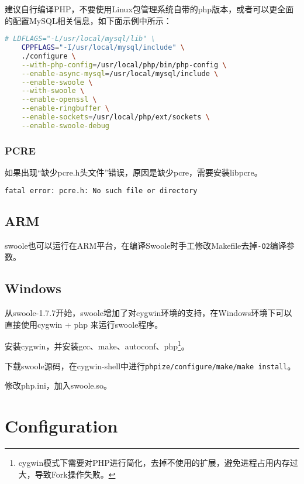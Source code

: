 建议自行编译PHP，不要使用Linux包管理系统自带的php版本，或者可以更全面的配置MySQL相关信息，如下面示例中所示：


\begin{lstlisting}[language=bash]
# LDFLAGS="-L/usr/local/mysql/lib" \
	CPPFLAGS="-I/usr/local/mysql/include" \
	./configure \
	--with-php-config=/usr/local/php/bin/php-config \
	--enable-async-mysql=/usr/local/mysql/include \
	--enable-swoole \
	--with-swoole \
	--enable-openssl \
	--enable-ringbuffer \
	--enable-sockets=/usr/local/php/ext/sockets \
	--enable-swoole-debug
\end{lstlisting}

\subsection{PCRE}

如果出现“缺少pcre.h头文件”错误，原因是缺少pcre，需要安装libpcre。


\begin{lstlisting}[language=bash]
fatal error: pcre.h: No such file or directory
\end{lstlisting}

\section{ARM}


swoole也可以运行在ARM平台，在编译Swoole时手工修改Makefile去掉\texttt{-O2}编译参数。

\section{Windows}


从swoole-1.7.7开始，swoole增加了对cygwin环境的支持，在Windows环境下可以直接使用cygwin + php 来运行swoole程序。

\begin{compactitem}
\item 安装cygwin，并安装gcc、make、autoconf、php\footnote{cygwin模式下需要对PHP进行简化，去掉不使用的扩展，避免进程占用内存过大，导致Fork操作失败。}。
\item 下载swoole源码，在cygwin-shell中进行\texttt{phpize/configure/make/make install}。
\item 修改php.ini，加入swoole.so。
\end{compactitem}




\chapter{Configuration}


